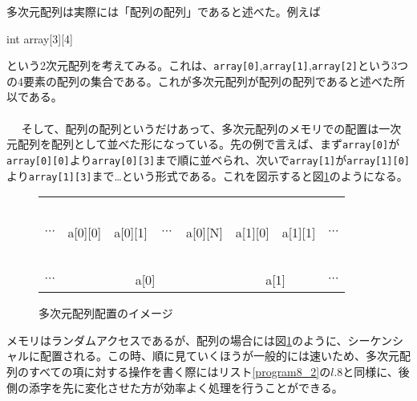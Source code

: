多次元配列は実際には「配列の配列」であると述べた。例えば
\begin{code}
int array[3][4]
\end{code}
という2次元配列を考えてみる。これは、\verb|array[0]|,\verb|array[1]|,\verb|array[2]|という3つの4要素の配列の集合である。これが多次元配列が配列の配列であると述べた所以である。
\\ \\　
そして、配列の配列というだけあって、多次元配列のメモリでの配置は一次元配列を配列として並べた形になっている。先の例で言えば、まず\verb|array[0]|が\verb|array[0][0]|より\verb|array[0][3]|まで順に並べられ、次いで\verb|array[1]|が\verb|array[1][0]|より\verb|array[1][3]|まで…という形式である。これを図示すると図\ref{chap08_fig02}のようになる。
\begin{figure}[htb]
\centering
\begin{tabular}{|c|c|c|c|c|c|c|c|}\hline
&　&　&　&　&　&　&\\
$\cdots$&a[0][0]&a[0][1]&$\cdots$&a[0][N]&a[1][0]&a[1][1]&$\cdots$ \\
&　&　&　&　&　&　&\\ \hline
$\cdots$&\multicolumn{4}{|c|}{a[0]}&\multicolumn{2}{|c}{a[1]}&$\cdots$\\ \hline
\end{tabular}
\caption{多次元配列配置のイメージ}\label{chap08_fig02}
\end{figure}

メモリはランダムアクセスであるが、配列の場合には図\ref{chap08_fig02}のように、シーケンシャルに配置される。この時、順に見ていくほうが一般的には速いため、多次元配列のすべての項に対する操作を書く際にはリスト\ref{program8_2}の$l$.8と同様に、後側の添字を先に変化させた方が効率よく処理を行うことができる。

